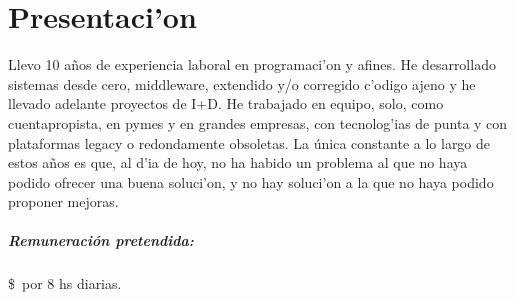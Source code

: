 \documentclass[a4paper,10pt, spanish]{article}
\newcommand\remuneracion{}
\renewcommand\remuneracion{}
\renewcommand\remuneracion{\subparagraph{Remuneraci\'on pretendida:}\$\number\platita\ por 8 hs diarias.}
\begin{document}
\maketitle


\section{Presentaci'on}
Llevo 10 a\~nos de experiencia laboral en programaci'on y afines.  He desarrollado sistemas desde
cero, middleware, extendido y/o corregido c'odigo ajeno y he llevado adelante proyectos de I+D.  He
trabajado en equipo, solo, como cuentapropista, en pymes y en grandes empresas, con tecnolog'ias de
punta y con plataformas legacy o redondamente obsoletas.  La única constante a lo largo de estos
años es que, al d'ia de hoy, no ha habido un problema al que no haya podido ofrecer una buena
soluci'on, y no hay soluci'on a la que no haya podido proponer mejoras.





\pagebreak



%


%




\remuneracion
\end{document}
